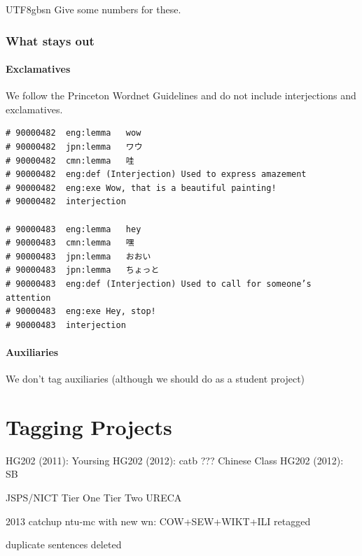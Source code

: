 \documentclass[12pt]{book} %
\begin{document}
\begin{CJK}{UTF8}{gbsn}
Give some numbers for these.


\subsection{What stays out}

\subsubsection{Exclamatives}
\label{sec:exclamatives}
We follow the Princeton Wordnet Guidelines \citep[pp
???]{_Fellbaum:1998} and do not include interjections and exclamatives.

\begin{verbatim}
# 90000482	eng:lemma	wow
# 90000482	jpn:lemma	ワウ
# 90000482	cmn:lemma	哇
# 90000482	eng:def	(Interjection) Used to express amazement
# 90000482	eng:exe	Wow, that is a beautiful painting!
# 90000482	interjection

# 90000483	eng:lemma	hey
# 90000483	cmn:lemma	嘿
# 90000483	jpn:lemma	おおい
# 90000483	jpn:lemma	ちょっと
# 90000483	eng:def	(Interjection) Used to call for someone’s attention
# 90000483	eng:exe	Hey, stop!
# 90000483	interjection
\end{verbatim}

\subsubsection{Auxiliaries}

We don't tag auxiliaries (although we should do as a student project)



\chapter{Tagging Projects}

HG202 (2011): Yoursing
HG202 (2012): catb
??? Chinese Class
HG202 (2012): SB

JSPS/NICT
Tier One
Tier Two
URECA


2013 catchup
ntu-mc with new wn: COW+SEW+WIKT+ILI
retagged

duplicate sentences deleted







\end{CJK}
\end{document}
